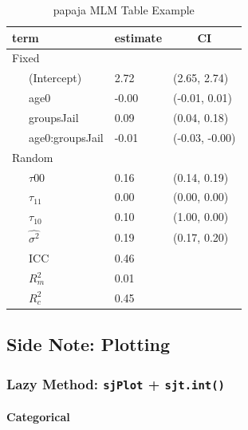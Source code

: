 \documentclass[]{article}
\let\oldparagraph\paragraph
\renewcommand{\paragraph}[1]{\oldparagraph{#1}\mbox{}}
\begin{document}
\begin{table}[tbp]
\begin{center}
\begin{threeparttable}
\caption{\label{tab:unnamed-chunk-28}papaja MLM Table Example}
\begin{tabular}{lll}
\toprule
term & \multicolumn{1}{c}{estimate} & \multicolumn{1}{c}{CI}\\
\midrule
Fixed &  & \\
\ \ \ (Intercept) & 2.72 & (2.65, 2.74)\\
\ \ \ age0 & -0.00 & (-0.01, 0.01)\\
\ \ \ groupsJail & 0.09 & (0.04, 0.18)\\
\ \ \ age0:groupsJail & -0.01 & (-0.03, -0.00)\\
Random &  & \\
\ \ \ $\tau{00}$ & 0.16 & (0.14, 0.19)\\
\ \ \ $\tau_{11}$ & 0.00 & (0.00, 0.00)\\
\ \ \ $\tau_{10}$ & 0.10 & (1.00, 0.00)\\
\ \ \ $\hat{\sigma^2}$ & 0.19 & (0.17, 0.20)\\
\ \ \ ICC & 0.46 & \\
\ \ \ $R^2_m$ & 0.01 & \\
\ \ \ $R^2_c$ & 0.45 & \\
\bottomrule
\end{tabular}
\end{threeparttable}
\end{center}
\end{table}

\normalsize

\subsection{Side Note: Plotting}\label{side-note-plotting}

\subsubsection{\texorpdfstring{Lazy Method: \texttt{sjPlot} +
\texttt{sjt.int()}}{Lazy Method: sjPlot + sjt.int()}}\label{lazy-method-sjplot-sjt.int}

\paragraph{Categorical}\label{categorical}

\small
\end{document}

